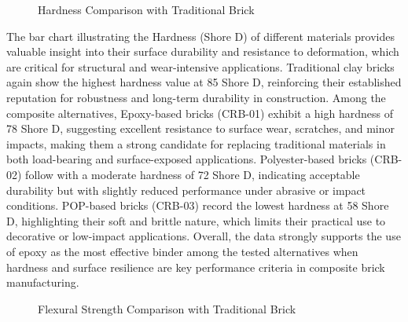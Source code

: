 \begin{figure}[H]
	\begin{minipage}{1\textwidth}
		\centering
		\caption{ Hardness Comparison with Traditional Brick}
	\end{minipage}
\end{figure}

The bar chart illustrating the Hardness (Shore D) of different materials provides valuable insight into their surface durability and resistance to deformation, which are critical for structural and wear-intensive applications. Traditional clay bricks again show the highest hardness value at 85 Shore D, reinforcing their established reputation for robustness and long-term durability in construction. Among the composite alternatives, Epoxy-based bricks (CRB-01) exhibit a high hardness of 78 Shore D, suggesting excellent resistance to surface wear, scratches, and minor impacts, making them a strong candidate for replacing traditional materials in both load-bearing and surface-exposed applications. Polyester-based bricks (CRB-02) follow with a moderate hardness of 72 Shore D, indicating acceptable durability but with slightly reduced performance under abrasive or impact conditions. POP-based bricks (CRB-03) record the lowest hardness at 58 Shore D, highlighting their soft and brittle nature, which limits their practical use to decorative or low-impact applications. Overall, the data strongly supports the use of epoxy as the most effective binder among the tested alternatives when hardness and surface resilience are key performance criteria in composite brick manufacturing.

\begin{figure}[H]
	\begin{minipage}{1\textwidth}
		\centering
		\caption{Flexural Strength Comparison with Traditional Brick }
	\end{minipage}
\end{figure}

